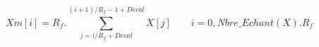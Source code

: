 $$
Xm[i] = R_f . \sum_{j = i/R_f + Decal}^{(i+1)/R_f -1 + Decal} X[j]
\qquad i=0,Nbre\_Echant(X). R_f
$$
